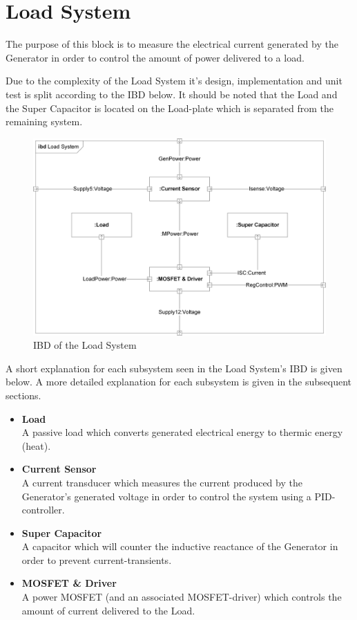 \newpage
\section{Load System}
The purpose of this block is to measure the electrical current generated by the Generator in order to control the amount of power delivered to a load.

Due to the complexity of the Load System it's design, implementation and unit test is split according to the IBD below. It should be noted that the Load and the Super Capacitor is located on the Load-plate which is separated from the remaining system.

\begin{figure}[H]
	\centering
	\includegraphics[width=1\linewidth]{Hardware/Pictures/IBD_LoadSystem}
	\caption{IBD of the Load System}
	\label{fig:IBD_Load_System}
\end{figure}

A short explanation for each subsystem seen in the Load System's IBD is given below. A more detailed explanation for each subsystem is given in the subsequent sections.
\begin{itemize}
	\item \textbf{Load}\\
	A passive load which converts generated electrical energy to thermic energy (heat).
	\item \textbf{Current Sensor}\\
	A current transducer which measures the current produced by the Generator's generated voltage in order to control the system using a PID-controller.
	\item \textbf{Super Capacitor}\\
	A capacitor which will counter the inductive reactance of the Generator in order to prevent current-transients.
	\item \textbf{MOSFET \& Driver}\\
	A power MOSFET (and an associated MOSFET-driver) which controls the amount of current delivered to the Load.
\end{itemize}
\newpage

